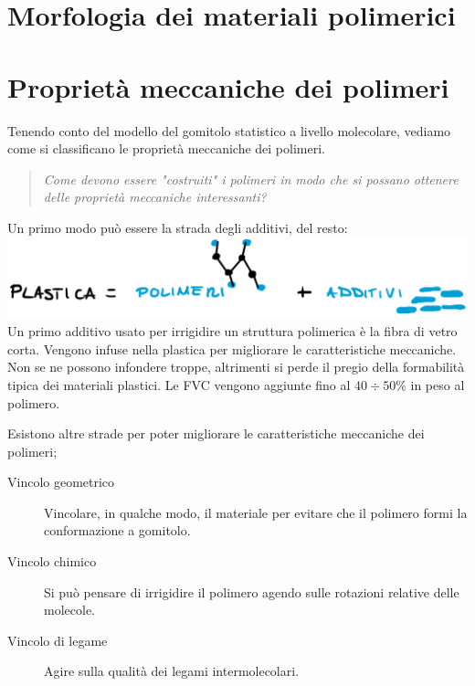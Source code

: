 \chapter{Morfologia dei materiali polimerici}\label{ch:Morfologia}


\chapter{Proprietà meccaniche dei polimeri}\label{chp:MeccanicaPolimeri}
Tenendo conto del modello del gomitolo statistico a livello molecolare, vediamo come si classificano le proprietà meccaniche dei polimeri.
\begin{quote}
\emph{Come devono essere "costruiti" i polimeri in modo che si possano ottenere delle proprietà meccaniche interessanti?}
\end{quote}

Un primo modo può essere la strada degli additivi, del resto:\\
\includegraphics[width = \textwidth]{gfx/Plastica}\\
Un primo additivo usato per irrigidire un struttura polimerica è la fibra di vetro corta.
Vengono infuse nella plastica per migliorare le caratteristiche meccaniche.
Non se ne possono infondere troppe, altrimenti si perde il pregio della formabilità tipica dei materiali plastici.
Le \ac{FVC} vengono aggiunte fino al $40 \div 50\%$ in peso al polimero.

Esistono altre strade per poter migliorare le caratteristiche meccaniche dei polimeri;
\begin{description}
\item[Vincolo geometrico] Vincolare, in qualche modo, il materiale per evitare che il polimero formi la conformazione a gomitolo.
\item[Vincolo chimico] Si può pensare di irrigidire il polimero agendo sulle rotazioni relative delle molecole.
\item[Vincolo di legame] Agire sulla qualità dei legami intermolecolari.
\end{description}

